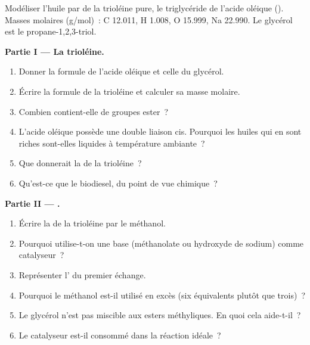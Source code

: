 \begin{problem}
\label{pb:b2:acyl-substitution:1}
Modéliser l'huile par de la trioléine pure, le triglycéride de l'acide oléique ().
Masses molaires (\unit{g/mol})~: C 12.011, H 1.008, O 15.999, Na 22.990. Le glycérol est le propane-1,2,3-triol.

\medskip
\noindent\textbf{Partie I --- La trioléine.}
\begin{enumerate}
  \item Donner la formule de l'acide oléique et celle du glycérol.
  \item Écrire la formule de la trioléine et calculer sa masse molaire.
  \item Combien contient-elle de groupes ester~?
  \item L'acide oléique possède une double liaison cis. Pourquoi les huiles qui en sont riches sont-elles liquides à température ambiante~?
  \item Que donnerait la  de la trioléine~?
  \item Qu'est-ce que le biodiesel, du point de vue chimique~?
\end{enumerate}

\medskip
\noindent\textbf{Partie II --- .}
\begin{enumerate}[resume]
  \item Écrire la  de la trioléine par le méthanol.
  \item Pourquoi utilise-t-on une base (méthanolate ou hydroxyde de sodium) comme catalyseur~?
  \item Représenter l' du premier échange.
  \item Pourquoi le méthanol est-il utilisé en excès (six équivalents plutôt que trois)~?
  \item Le glycérol n'est pas miscible aux esters méthyliques. En quoi cela aide-t-il~?
  \item Le catalyseur est-il consommé dans la réaction idéale~?
\end{enumerate}


\end{problem}
